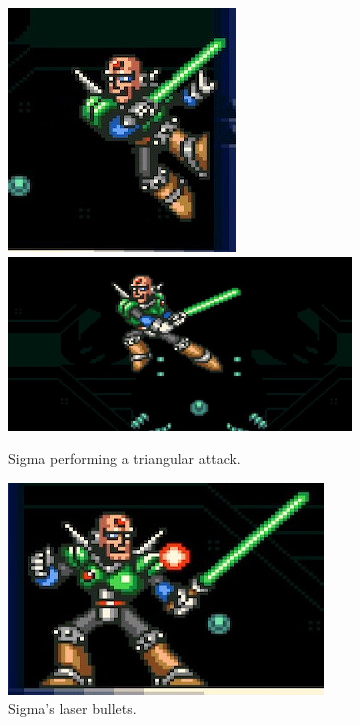 \begin{figure}[htp]
	\centering
	\begin{subfigure}{\linewidth}
		\centering
		\includegraphics[width=0.3\linewidth]{figures/X1/Sigma_stages/Sigma_leap_3.jpg}
		\includegraphics[width=0.64
		\linewidth]{figures/X1/Sigma_stages/Sigma_leap.jpg}
		\caption{Sigma performing a triangular attack.}
	\end{subfigure}
	\begin{subfigure}[t]{0.43\linewidth}
		\centering
		\includegraphics[width=\linewidth]{figures/X1/Sigma_stages/Sigma_plasma.jpg}
		\caption{Sigma's laser bullets.}
	\end{subfigure}
	\begin{subfigure}[t]{0.4\linewidth}
		\centering

\end{subfigure}
\end{figure}
